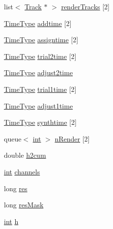\begin{DoxyCompactItemize}
list$<$ \hyperlink{class__sbsms___1_1_track}{Track} $\ast$ $>$ \hyperlink{class__sbsms___1_1_s_m_s_a57ed3a1ef12c3451aeec26b35c88e234}{render\+Tracks} \mbox{[}2\mbox{]}
\item 
\hyperlink{namespace__sbsms___a3a161c3deff71e932c0ec86aad54eb7c}{Time\+Type} \hyperlink{class__sbsms___1_1_s_m_s_aa1a0a6eb03f1a93deb48f0bb01a94aca}{addtime} \mbox{[}2\mbox{]}
\item 
\hyperlink{namespace__sbsms___a3a161c3deff71e932c0ec86aad54eb7c}{Time\+Type} \hyperlink{class__sbsms___1_1_s_m_s_a0e1dd043e25c053ccf843b637fb40eb6}{assigntime} \mbox{[}2\mbox{]}
\item 
\hyperlink{namespace__sbsms___a3a161c3deff71e932c0ec86aad54eb7c}{Time\+Type} \hyperlink{class__sbsms___1_1_s_m_s_a372eb830fb9ba81f9fa66b22e8fa76a3}{trial2time} \mbox{[}2\mbox{]}
\item 
\hyperlink{namespace__sbsms___a3a161c3deff71e932c0ec86aad54eb7c}{Time\+Type} \hyperlink{class__sbsms___1_1_s_m_s_a944f5215762039163c3a442f967d88ef}{adjust2time}
\item 
\hyperlink{namespace__sbsms___a3a161c3deff71e932c0ec86aad54eb7c}{Time\+Type} \hyperlink{class__sbsms___1_1_s_m_s_acf420b2b5004dc7305c4843644a020ae}{trial1time} \mbox{[}2\mbox{]}
\item 
\hyperlink{namespace__sbsms___a3a161c3deff71e932c0ec86aad54eb7c}{Time\+Type} \hyperlink{class__sbsms___1_1_s_m_s_a41119c7a08f31f37ba05af1e5601e115}{adjust1time}
\item 
\hyperlink{namespace__sbsms___a3a161c3deff71e932c0ec86aad54eb7c}{Time\+Type} \hyperlink{class__sbsms___1_1_s_m_s_af4aa43d2c075a22652570067f227c751}{synthtime} \mbox{[}2\mbox{]}
\item 
queue$<$ \hyperlink{xmltok_8h_a5a0d4a5641ce434f1d23533f2b2e6653}{int} $>$ \hyperlink{class__sbsms___1_1_s_m_s_aeb589c7707f9e70f93a6c511b349fd1d}{n\+Render} \mbox{[}2\mbox{]}
\item 
double \hyperlink{class__sbsms___1_1_s_m_s_a2c13200d3b1b6e024e46c57307d53f48}{h2cum}
\item 
\hyperlink{xmltok_8h_a5a0d4a5641ce434f1d23533f2b2e6653}{int} \hyperlink{class__sbsms___1_1_s_m_s_a8e89dccb17998302db6a1c4c5a0b7c8b}{channels}
\item 
long \hyperlink{class__sbsms___1_1_s_m_s_a091e988e65c11c86875e6ecdb1efbf91}{res}
\item 
long \hyperlink{class__sbsms___1_1_s_m_s_a970321e0f623109a552c50477adccd16}{res\+Mask}
\item 
\hyperlink{xmltok_8h_a5a0d4a5641ce434f1d23533f2b2e6653}{int} \hyperlink{class__sbsms___1_1_s_m_s_a1f651e7489c4cb796fa6d55fb8ca5c70}{h}

\end{DoxyCompactItemize}
